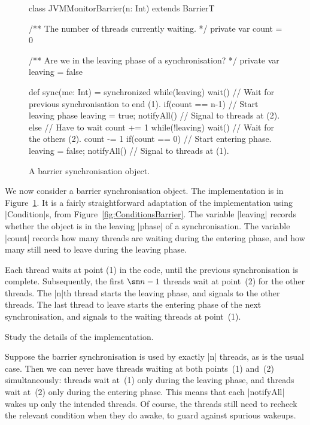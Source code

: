 
\begin{figure}[btp]
\begin{scala}
class JVMMonitorBarrier(n: Int) extends BarrierT{
  /** The number of threads currently waiting. */
  private var count = 0

  /** Are we in the leaving phase of a synchronisation? */
  private var leaving = false

  def sync(me: Int) = synchronized{
    while(leaving) wait() // Wait for previous synchronisation to end (1).
    if(count == n-1){      // Start leaving phase
      leaving = true; notifyAll() // Signal to threads at (2).
    }
    else{      // Have to wait
      count += 1
      while(!leaving) wait() // Wait for the others (2).
      count -= 1
    }
    if(count == 0){      // Start entering phase.
      leaving = false; notifyAll() // Signal to threads at (1).
    }
  }
} 
\end{scala}
\caption{A barrier synchronisation object.}
\label{fig:JVMMonitorBarrier}
\end{figure}


We now consider a barrier synchronisation object.  The implementation is in
Figure~\ref{fig:JVMMonitorBarrier}.  It is a fairly straightforward adaptation
of the implementation using |Condition|s, from
Figure~\ref{fig:ConditionsBarrier}.  The variable |leaving| records whether
the object is in the leaving |phase| of a synchronisation.  The variable
|count| records how many threads are waiting during the entering phase, and
how many still need to leave during the leaving phase.

Each thread waits at point (1) in the code, until the previous synchronisation
is complete.  Subsequently, the first $\sm n -1$ threads wait at point~(2) for
the other threads.  The |n|th thread starts the leaving phase, and signals to
the other threads.  The last thread to leave starts the entering phase of the
next synchronisation, and signals to the waiting threads at point~(1).

\begin{instruction}
Study the details of the implementation.
\end{instruction}

Suppose the barrier synchronisation is used by exactly |n| threads, as is the
usual case.  Then we can never have threads waiting at both points~(1) and~(2)
simultaneously: threads wait at~(1) only during the leaving phase, and threads
wait at~(2) only during the entering phase.  This means that each |notifyAll|
wakes up only the intended threads.  Of course, the threads still need to
recheck the relevant condition when they do awake, to guard against spurious
wakeups.

